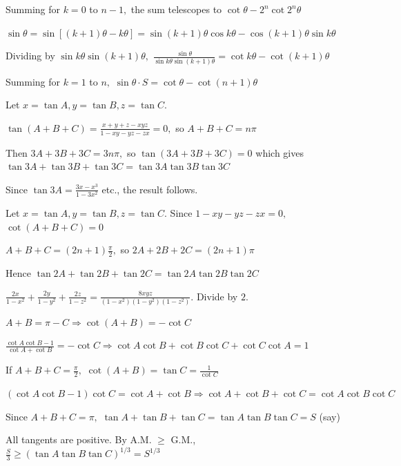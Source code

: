   Summing for $k = 0$ to $n - 1,$ the sum telescopes to $\cot\theta - 2^n\cot 2^n\theta$

\item $\sin\theta = \sin[(k + 1)\theta - k\theta] = \sin(k + 1)\theta\cos k\theta - \cos(k + 1)\theta\sin k\theta$

  Dividing by $\sin k\theta\sin(k + 1)\theta,$ $\frac{\sin\theta}{\sin k\theta\sin(k + 1)\theta} = \cot k\theta -
  \cot(k + 1)\theta$

  Summing for $k = 1$ to $n,$ $\sin\theta\cdot S = \cot\theta - \cot(n + 1)\theta$

\item Let $x = \tan A, y = \tan B, z = \tan C.$

  $\tan(A + B + C) = \frac{x + y + z - xyz}{1 - xy - yz - zx} = 0,$ so $A + B + C = n\pi$

  Then $3A + 3B + 3C = 3n\pi,$ so $\tan(3A + 3B + 3C) = 0$ which gives $\tan 3A + \tan 3B + \tan 3C = \tan 3A\tan 3B\tan
  3C$

  Since $\tan 3A = \frac{3x - x^3}{1 - 3x^2}$ etc., the result follows.

\item Let $x = \tan A, y = \tan B, z = \tan C.$ Since $1 - xy - yz - zx = 0,$ $\cot(A + B + C) = 0$

  $A + B + C = (2n + 1)\frac{\pi}{2},$ so $2A + 2B + 2C = (2n + 1)\pi$

  Hence $\tan 2A + \tan 2B + \tan 2C = \tan 2A\tan 2B\tan 2C$

  $\frac{2x}{1 - x^2} + \frac{2y}{1 - y^2} + \frac{2z}{1 - z^2} = \frac{8xyz}{(1 - x^2)(1 - y^2)(1 - z^2)}.$ Divide by
  $2.$

\item $A + B = \pi - C \Rightarrow \cot(A + B) = -\cot C$

  $\frac{\cot A\cot B - 1}{\cot A + \cot B} = -\cot C \Rightarrow \cot A\cot B + \cot B\cot C + \cot C\cot A = 1$

  If $A + B + C = \frac{\pi}{2},$ $\cot(A + B) = \tan C = \frac{1}{\cot C}$

  $(\cot A\cot B - 1)\cot C = \cot A + \cot B \Rightarrow \cot A + \cot B + \cot C = \cot A\cot B\cot C$

\item Since $A + B + C = \pi,$ $\tan A + \tan B + \tan C = \tan A\tan B\tan C = S$ (say)

  All tangents are positive. By A.M. $\geq$ G.M., $\frac{S}{3} \geq (\tan A\tan B\tan C)^{1/3} = S^{1/3}$

